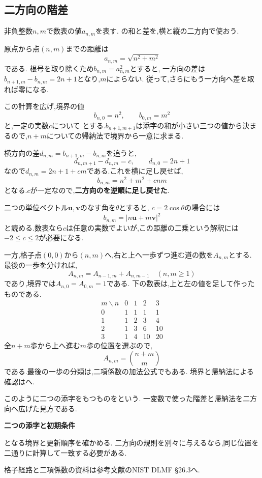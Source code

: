 \subsection{二方向の階差}\label{節：二方向の階差}
非負整数$n,m$で数表の値$a_{n,m}$を表す.
の和と差を,横と縦の二方向で使おう.

原点から点$(n,m)$までの距離は
\[ a_{n,m}=\sqrt{n^2+m^2} \]
である.
根号を取り除くため$b_{n,m}=a_{n,m}^2$とすると,
一方向の差は$b_{n+1,m}-b_{n,m}=2n+1$となり,$m$によらない.
従って,さらにもう一方向へ差を取れば零になる.

この計算を広げ,境界の値
\[
  b_{n,0}=n^2,\qquad b_{0,m}=m^2
\]
と,一定の実数$c$について
\BookMathLayout{\[
    b_{n+1,m+1}-b_{n+1,m}-b_{n,m+1}+b_{n,m}=c
  \]}{\[
    \begin{aligned}
      b_{n+1,m+1}-b_{n+1,m}\\
      {}-b_{n,m+1}+b_{n,m}=c
    \end{aligned}
  \]}
とする.$b_{n+1,m+1}$は添字の和が小さい三つの値から決まるので,$n+m$についての帰納法で境界から一意に求まる.

横方向の差$d_{n,m}=b_{n+1,m}-b_{n,m}$を追うと,
\[
  d_{n,m+1}-d_{n,m}=c,\qquad d_{n,0}=2n+1
\]
なので$d_{n,m}=2n+1+cm$である.これを横に足し戻せば,
\[
  b_{n,m}=n^2+m^2+cnm
\]
となる.$c$が一定なので,\textbf{二方向のを逆順に足し戻せた}.

二つの単位ベクトル$\boldsymbol u,\boldsymbol v$のなす角を$\theta$とすると,
$c=2\cos\theta$の場合には
\[
  b_{n,m}=|n\boldsymbol u+m\boldsymbol v|^2
\]
と読める.数表なら$c$は任意の実数でよいが,この距離の二乗という解釈には$-2\le c\le2$が必要になる.

一方,格子点$(0,0)$から$(n,m)$へ,右と上へ一歩ずつ進む道の数を$A_{n,m}$とする.
最後の一歩を分ければ,
\[
  A_{n,m}=A_{n-1,m}+A_{n,m-1}\quad(n,m\ge1)
\]
であり,境界では$A_{n,0}=A_{0,m}=1$である.
\BookFigLatticeRecurrence
下の数表は,上と左の値を足して作ったものである.
\[
  \begin{array}{c|rrrr}
    m\backslash n&0&1&2&3\\\hline
    0&1&1&1&1\\
    1&1&2&3&4\\
    2&1&3&6&10\\
    3&1&4&10&20
  \end{array}
\]
全$n+m$歩から上へ進む$m$歩の位置を選ぶので,
\[
  A_{n,m}=\binom{n+m}{m}
\]
である.最後の一歩の分類は,二項係数の加法公式でもある.
境界と帰納法による確認はへ.

このように二つの添字をもつものを\textbf{}という.
一変数で使った階差と帰納法を二方向へ広げた見方である.

\begin{bookpoint}
  \textbf{二つの添字と初期条件}\par
  となる境界と更新順序を確かめる.
  二方向の規則を別々に与えるなら,同じ位置を二通りに計算して一致する必要がある.
\end{bookpoint}
格子経路と二項係数の資料は参考文献のNIST DLMF §26.3へ.
